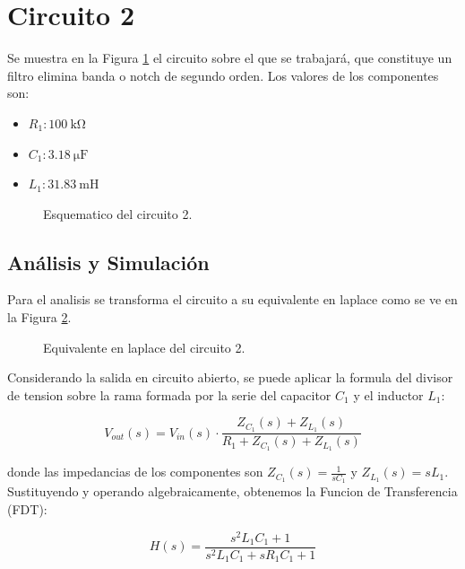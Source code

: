 \section{Circuito 2}
\label{chap:circuito_2}

Se muestra en la Figura \ref{fig:esquematico_circuito_2} el circuito sobre el que se trabajará, que constituye un filtro elimina banda o notch de segundo orden. Los valores de los componentes son:

\begin{itemize}
  \item $R_1: \SI{100}{\kilo\ohm}$
  \item $C_1: \SI{3.18}{\micro\farad}$
  \item $L_1: \SI{31.83}{\milli\henry}$
\end{itemize}

\begin{figure}[H]
  \centering
  
  \caption{Esquematico del circuito 2.}
  \label{fig:esquematico_circuito_2}
\end{figure}

\subsection{Análisis y Simulación}
\label{sec:analisis_circ_2}

Para el analisis se transforma el circuito a su equivalente en laplace como se ve en la Figura \ref{fig:laplace_circuito_2}.

\begin{figure}[H]
  \centering
  
  \caption{Equivalente en laplace del circuito 2.}
  \label{fig:laplace_circuito_2}
\end{figure}

Considerando la salida en circuito abierto, se puede aplicar la formula del divisor de tension sobre la rama formada por la serie del capacitor $C_1$ y el inductor $L_1$:

\begin{equation}
  V_{out}(s) = V_{in}(s) \cdot \frac{Z_{C_1}(s) + Z_{L_1}(s)}{R_1 + Z_{C_1}(s) + Z_{L_1}(s)}
\end{equation}

donde las impedancias de los componentes son $Z_{C_1}(s) = \frac{1}{s C_1}$ y $Z_{L_1}(s) = s L_1$. Sustituyendo y operando algebraicamente, obtenemos la Funcion de Transferencia (FDT):

\begin{equation}
  H(s) = \frac{s^2 L_1 C_1 + 1}{s^2 L_1 C_1 + s R_1 C_1 + 1}
\end{equation}

